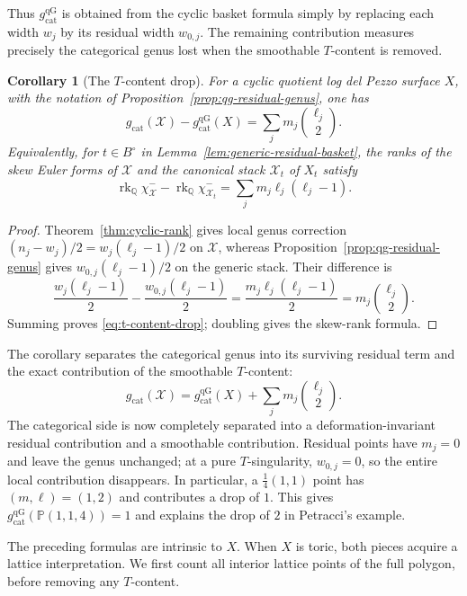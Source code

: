 \documentclass[11pt]{article}
\theoremstyle{plain}
\newtheorem{corollary}[theorem]{Corollary}
\theoremstyle{definition}
\theoremstyle{remark}
\newcommand{\cX}{\mathcal X}
\newcommand{\rk}{\operatorname{rk}}
\newcommand{\Q}{\mathbb Q}
\newcommand{\Pj}{\mathbb P}
\newcommand{\1}{\mathbf 1}
\begin{document}
Thus $g_{\mathrm{cat}}^{\mathrm{qG}}$ is obtained from the cyclic basket formula simply by replacing each width $w_j$ by its residual width $w_{0,j}$.  The remaining contribution measures precisely the categorical genus lost when the smoothable $T$-content is removed.

\begin{corollary}[The $T$-content drop]\label{cor:t-content-drop}
For a cyclic quotient log del Pezzo surface $X$, with the notation of Proposition~\ref{prop:qg-residual-genus}, one has
\begin{equation}\label{eq:t-content-drop}
\boxed{g_{\mathrm{cat}}(\cX)-g_{\mathrm{cat}}^{\mathrm{qG}}(X)
=\sum_j m_j\binom{\ell_j}{2}.}
\end{equation}
Equivalently, for $t\in B^\circ$ in Lemma~\ref{lem:generic-residual-basket}, the ranks of the skew Euler forms of $\cX$ and the canonical stack $\mathcal X_t$ of $X_t$ satisfy
\[
\boxed{\rk_{\Q}\chi^-_{\cX}-\rk_{\Q}\chi^-_{\mathcal X_t}
=\sum_j m_j\ell_j(\ell_j-1).}
\]
\end{corollary}

\begin{proof}
Theorem~\ref{thm:cyclic-rank} gives local genus correction
$(n_j-w_j)/2=w_j(\ell_j-1)/2$ on $\cX$, whereas Proposition~\ref{prop:qg-residual-genus} gives $w_{0,j}(\ell_j-1)/2$ on the generic stack.  Their difference is
\[
\frac{w_j(\ell_j-1)}2-\frac{w_{0,j}(\ell_j-1)}2
=\frac{m_j\ell_j(\ell_j-1)}2
=m_j\binom{\ell_j}{2}.
\]
Summing proves \eqref{eq:t-content-drop}; doubling gives the skew-rank formula.
\end{proof}

The corollary separates the categorical genus into its surviving residual term and the exact contribution of the smoothable $T$-content:
\[
\boxed{g_{\mathrm{cat}}(\cX)
=g_{\mathrm{cat}}^{\mathrm{qG}}(X)+\sum_jm_j\binom{\ell_j}{2}.}
\]
The categorical side is now completely separated into a deformation-invariant residual contribution and a smoothable contribution.  Residual points have $m_j=0$ and leave the genus unchanged; at a pure $T$-singularity, $w_{0,j}=0$, so the entire local contribution disappears.  In particular, a $\frac14(1,1)$ point has $(m,\ell)=(1,2)$ and contributes a drop of $1$.  This gives $g_{\mathrm{cat}}^{\mathrm{qG}}(\Pj(1,1,4))=1$ and explains the drop of $2$ in Petracci's example.

The preceding formulas are intrinsic to $X$.  When $X$ is toric, both pieces acquire a lattice interpretation.  We first count all interior lattice points of the full polygon, before removing any $T$-content.
\end{document}
